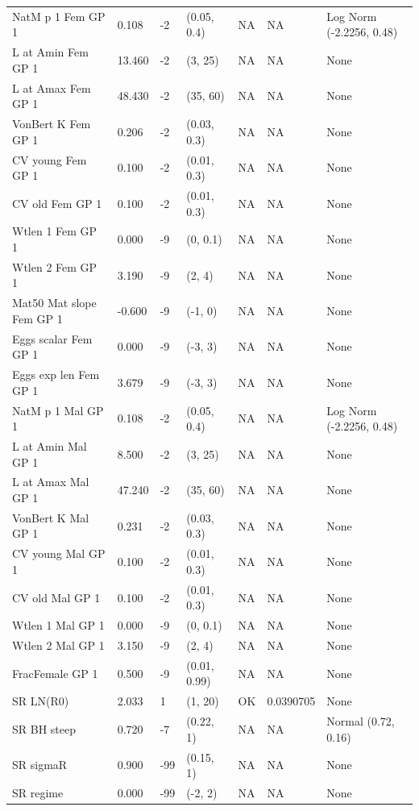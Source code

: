 \documentclass[11pt,
  english,
  a4paper,
]{article}
\begin{document}
\begin{landscape}
\begin{longtable}[t]{>{\raggedright\arraybackslash}p{6cm}lllll>{\raggedright\arraybackslash}p{4cm}}
\endfoot
\bottomrule
\endlastfoot
NatM p 1 Fem GP 1 & 0.108 & -2 & (0.05, 0.4) & NA & NA & Log Norm (-2.2256, 0.48)\\
L at Amin Fem GP 1 & 13.460 & -2 & (3, 25) & NA & NA & None\\
L at Amax Fem GP 1 & 48.430 & -2 & (35, 60) & NA & NA & None\\
VonBert K Fem GP 1 & 0.206 & -2 & (0.03, 0.3) & NA & NA & None\\
CV young Fem GP 1 & 0.100 & -2 & (0.01, 0.3) & NA & NA & None\\
CV old Fem GP 1 & 0.100 & -2 & (0.01, 0.3) & NA & NA & None\\
Wtlen 1 Fem GP 1 & 0.000 & -9 & (0, 0.1) & NA & NA & None\\
Wtlen 2 Fem GP 1 & 3.190 & -9 & (2, 4) & NA & NA & None\\
Mat50%
Mat slope Fem GP 1 & -0.600 & -9 & (-1, 0) & NA & NA & None\\
Eggs scalar Fem GP 1 & 0.000 & -9 & (-3, 3) & NA & NA & None\\
Eggs exp len Fem GP 1 & 3.679 & -9 & (-3, 3) & NA & NA & None\\
NatM p 1 Mal GP 1 & 0.108 & -2 & (0.05, 0.4) & NA & NA & Log Norm (-2.2256, 0.48)\\
L at Amin Mal GP 1 & 8.500 & -2 & (3, 25) & NA & NA & None\\
L at Amax Mal GP 1 & 47.240 & -2 & (35, 60) & NA & NA & None\\
VonBert K Mal GP 1 & 0.231 & -2 & (0.03, 0.3) & NA & NA & None\\
CV young Mal GP 1 & 0.100 & -2 & (0.01, 0.3) & NA & NA & None\\
CV old Mal GP 1 & 0.100 & -2 & (0.01, 0.3) & NA & NA & None\\
Wtlen 1 Mal GP 1 & 0.000 & -9 & (0, 0.1) & NA & NA & None\\
Wtlen 2 Mal GP 1 & 3.150 & -9 & (2, 4) & NA & NA & None\\
FracFemale GP 1 & 0.500 & -9 & (0.01, 0.99) & NA & NA & None\\
SR LN(R0) & 2.033 & 1 & (1, 20) & OK & 0.0390705 & None\\
SR BH steep & 0.720 & -7 & (0.22, 1) & NA & NA & Normal (0.72, 0.16)\\
SR sigmaR & 0.900 & -99 & (0.15, 1) & NA & NA & None\\
SR regime & 0.000 & -99 & (-2, 2) & NA & NA & None\\

\end{longtable}
\end{landscape}
\end{document}
